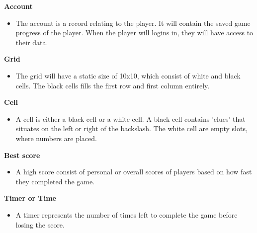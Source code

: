 \documentclass[12pt]{article}
\begin{document}
\vspace{5mm}

\textbf{Account}
\vspace{5mm}
\begin{itemize}
   \item The account is a record relating to the player. It will contain the saved game progress of the player. When the player will logins in, they will have access to their data.
\end{itemize}

\vspace{5mm}

\textbf{Grid}
\vspace{5mm}
\begin{itemize}
   \item The grid will have a static size of 10x10, which consist of white and black cells. The black cells fills the first row and first column entirely.
\end{itemize}

\vspace{5mm}

\textbf{Cell} 
\vspace{5mm}
\begin{itemize}
   \item A cell is either a black cell or a white cell. A black cell contains 'clues' that situates on the left or right of the backslash. The white cell are empty slots, where numbers are placed.
\end{itemize}

\vspace{5mm}

\textbf{Best score}
\vspace{5mm}
\begin{itemize}
   \item A high score consist of personal or overall scores of players based on how fast they completed the game.
\end{itemize}

\vspace{5mm}

\textbf{Timer or Time}
\vspace{5mm}
\begin{itemize}
   \item A timer represents the number of times left to complete the game before losing the score.
\end{itemize}

\vspace{5mm}
\end{document}
